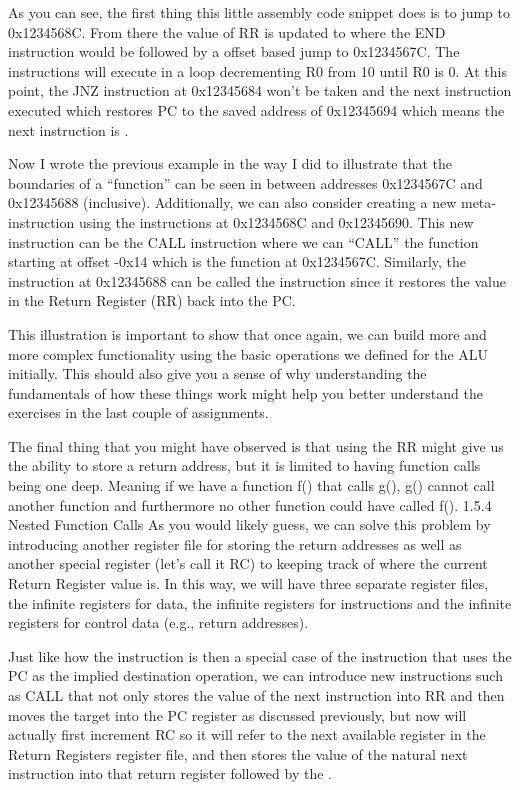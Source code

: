 As you can see, the first thing this little assembly code snippet does is to jump to 0x1234568C. From there the value of RR is updated to where the END instruction would be followed by a offset based jump to 0x1234567C. The instructions will execute in a loop decrementing R0 from 10 until R0 is 0. At this point, the JNZ instruction at 0x12345684 won’t be taken and the next instruction executed which restores PC to the saved address of 0x12345694 which means the next instruction is .

Now I wrote the previous example in the way I did to illustrate that the boundaries of a “function” can be seen in between addresses 0x1234567C and 0x12345688 (inclusive). Additionally, we can also consider creating a new meta-instruction using the instructions at 0x1234568C and 0x12345690. This new instruction can be the CALL instruction where we can “CALL” the function starting at offset -0x14 which is the function at 0x1234567C. Similarly, the instruction at 0x12345688 can be called the  instruction since it restores the value in the Return Register (RR) back into the PC. 

This illustration is important to show that once again, we can build more and more complex functionality using the basic operations we defined for the ALU initially. This should also give you a sense of why understanding the fundamentals of how these things work might help you better understand the exercises in the last couple of assignments.

The final thing that you might have observed is that using the RR might give us the ability to store a return address, but it is limited to having function calls being one deep. Meaning if we have a function f() that calls g(), g() cannot call another function and furthermore no other function could have called f(). 
1.5.4  Nested Function Calls
As you would likely guess, we can solve this problem by introducing another register file for storing the return addresses as well as another special register (let’s call it RC) to keeping track of where the current Return Register value is. In this way, we will have three separate register files, the infinite registers for data, the infinite registers for instructions and the infinite registers for control data (e.g., return addresses). 

Just like how the  instruction is then a special case of the  instruction that uses the PC as the implied destination operation, we can introduce new instructions such as CALL that not only stores the value of the next instruction into RR and then moves the target into the PC register as discussed previously, but now  will actually first increment RC so it will refer to the next available register in the Return Registers register file, and then stores the value of the natural next instruction into that return register followed by the . 

